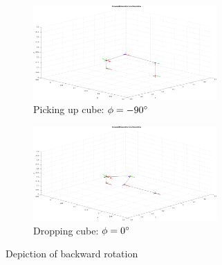 \documentclass[9pt, a4paper]{article}
\begin{document}
\begin{figure}[h]
  \centering
  \begin{subfigure}{.5\textwidth}
    \centering
    \includegraphics[width=7cm]{1}
    \caption{Picking up cube: $\phi = -90\degree$}
  \end{subfigure}%
  \begin{subfigure}{.5\textwidth}
    \centering
    \includegraphics[width=7cm]{2}
    \caption{Dropping cube: $\phi = 0\degree$}
  \end{subfigure}
  \caption{Depiction of backward rotation}
\end{figure}
\end{document}
